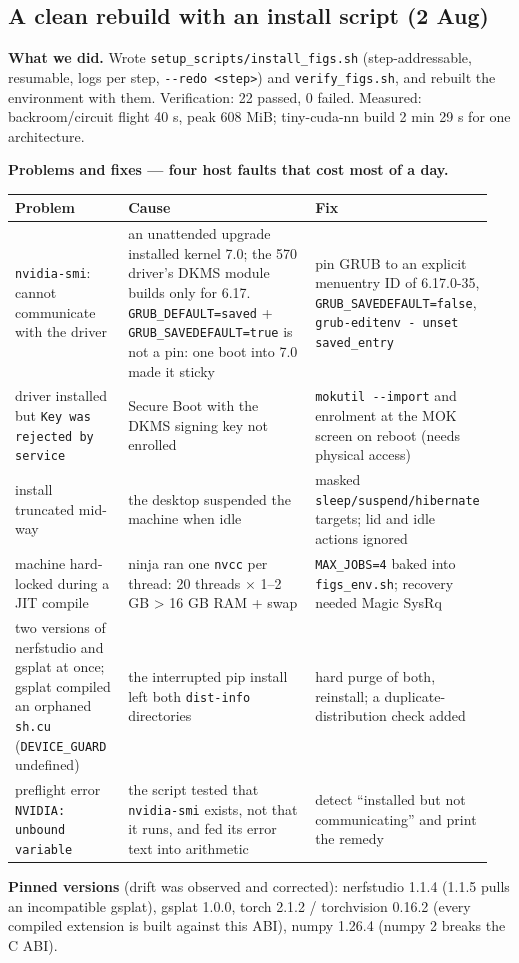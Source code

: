 \documentclass[11pt,a4paper]{article}
\newcommand{\code}[1]{\texttt{#1}}
\begin{document}
\subsection{A clean rebuild with an install script (2 Aug)}
\textbf{What we did.} Wrote \code{setup\_\allowbreak{}scripts/\allowbreak{}install\_\allowbreak{}figs.sh} (step-addressable, resumable, logs per step, \code{-{}-redo <step>}) and \code{verify\_\allowbreak{}figs.sh}, and rebuilt the environment with them. Verification: 22 passed, 0 failed. Measured: backroom/circuit flight 40 s, peak 608 MiB; tiny-cuda-nn build 2 min 29 s for one architecture.

\textbf{Problems and fixes — four host faults that cost most of a day.}

\begin{center}\small
\begin{tabular}{@{}>{\raggedright\arraybackslash}p{0.253\linewidth}>{\raggedright\arraybackslash}p{0.437\linewidth}>{\raggedright\arraybackslash}p{0.258\linewidth}@{}}
\toprule
\textbf{Problem} & \textbf{Cause} & \textbf{Fix} \\
\midrule
\code{nvidia-smi}: cannot communicate with the driver & an unattended upgrade installed kernel 7.0; the 570 driver's DKMS module builds only for 6.17. \code{GRUB\_\allowbreak{}DEFAULT=saved} + \code{GRUB\_\allowbreak{}SAVEDEFAULT=true} is not a pin: one boot into 7.0 made it sticky & pin GRUB to an explicit menuentry ID of 6.17.0-35, \code{GRUB\_\allowbreak{}SAVEDEFAULT=false}, \code{grub-editenv - unset saved\_\allowbreak{}entry} \\
driver installed but \code{Key was rejected by service} & Secure Boot with the DKMS signing key not enrolled & \code{mokutil -{}-import} and enrolment at the MOK screen on reboot (needs physical access) \\
install truncated mid-way & the desktop suspended the machine when idle & masked \code{sleep/\allowbreak{}suspend/\allowbreak{}hibernate} targets; lid and idle actions ignored \\
machine hard-locked during a JIT compile & ninja ran one \code{nvcc} per thread: 20 threads $\times$ 1–2 GB > 16 GB RAM + swap & \code{MAX\_\allowbreak{}JOBS=4} baked into \code{figs\_\allowbreak{}env.sh}; recovery needed Magic SysRq \\
two versions of nerfstudio and gsplat at once; gsplat compiled an orphaned \code{sh.cu} (\code{DEVICE\_\allowbreak{}GUARD} undefined) & the interrupted pip install left both \code{dist-info} directories & hard purge of both, reinstall; a duplicate-distribution check added \\
preflight error \code{NVIDIA: unbound variable} & the script tested that \code{nvidia-smi} exists, not that it runs, and fed its error text into arithmetic & detect ``installed but not communicating'' and print the remedy \\
\bottomrule
\end{tabular}
\end{center}
\textbf{Pinned versions} (drift was observed and corrected): nerfstudio 1.1.4 (1.1.5 pulls an incompatible gsplat), gsplat 1.0.0, torch 2.1.2 / torchvision 0.16.2 (every compiled extension is built against this ABI), numpy 1.26.4 (numpy 2 breaks the C ABI).
\end{document}
